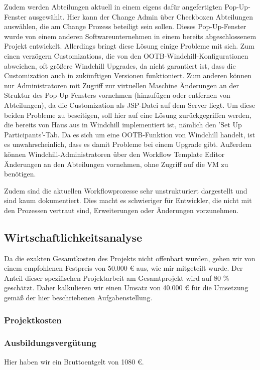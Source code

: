 Zudem werden Abteilungen aktuell in einem eigens dafür angefertigten Pop-Up-Fenster ausgewählt.
Hier kann der Change Admin über Checkboxen Abteilungen auswählen, die am Change Prozess beteiligt sein sollen.
Dieses Pop-Up-Fenster wurde von einem anderen Softwareunternehmen in einem bereits abgeschlossenem Projekt entwickelt.
Allerdings bringt diese Lösung einige Probleme mit sich.
Zum einen verzögern Customizations, die von den OOTB-Windchill-Konfigurationen abweichen, oft größere Windchill Upgrades, da nicht garantiert ist, dass die Customization auch in zukünftigen Versionen funktioniert.
Zum anderen können nur Administratoren mit Zugriff zur virtuellen Maschine Änderungen an der Struktur des Pop-Up-Fensters vornehmen (\zB hinzufügen oder entfernen von Abteilungen), da die Customization als JSP-Datei auf dem Server liegt.
Um diese beiden Probleme zu beseitigen, soll hier auf eine Lösung zurückgegriffen werden, die bereits von Haus aus in Windchill implementiert ist, nämlich den 'Set Up Participants'-Tab.
Da es sich um eine OOTB-Funktion von Windchill handelt, ist es unwahrscheinlich, dass es damit Probleme bei einem Upgrade gibt.
Außerdem können Windchill-Administratoren über den Workflow Template Editor Änderungen an den Abteilungen vornehmen, ohne Zugriff auf die VM zu benötigen.

Zudem sind die aktuellen Workflowprozesse sehr unstrukturiert dargestellt und sind kaum dokumentiert.
Dies macht es schwieriger für Entwickler, die nicht mit den Prozessen vertraut sind, Erweiterungen oder Änderungen vorzunehmen.
\subsection{Wirtschaftlichkeitsanalyse} %
\label{sec:Wirtschaftlichkeitsanalyse}

Da die exakten Gesamtkosten des Projekts nicht offenbart wurden, gehen wir von einem empfohlenen Festpreis von 50.000 € aus, wie mir mitgeteilt wurde. %
Der Anteil dieser spezifischen Projektarbeit am Gesamtprojekt wird auf 80 \% geschätzt.
Daher kalkulieren wir einen Umsatz von 40.000 € für die Umsetzung gemäß der hier beschriebenen Aufgabenstellung.

\subsubsection{Projektkosten}
\subsubsection*{Ausbildungsvergütung}
Hier haben wir ein Bruttoentgelt von 1080 €.

